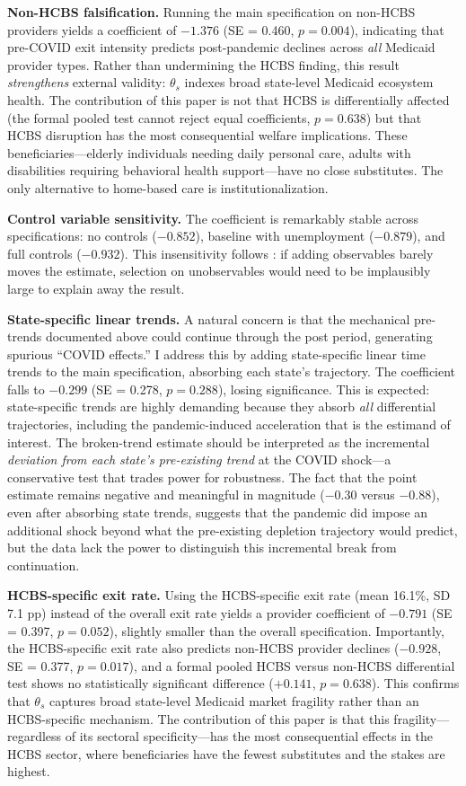 \documentclass[12pt]{article}
\begin{document}
\textbf{Non-HCBS falsification.} Running the main specification on non-HCBS providers yields a coefficient of $-1.376$ (SE = 0.460, $p = 0.004$), indicating that pre-COVID exit intensity predicts post-pandemic declines across \emph{all} Medicaid provider types. Rather than undermining the HCBS finding, this result \emph{strengthens} external validity: $\theta_s$ indexes broad state-level Medicaid ecosystem health. The contribution of this paper is not that HCBS is differentially affected (the formal pooled test cannot reject equal coefficients, $p = 0.638$) but that HCBS disruption has the most consequential welfare implications. These beneficiaries---elderly individuals needing daily personal care, adults with disabilities requiring behavioral health support---have no close substitutes. The only alternative to home-based care is institutionalization.

\textbf{Control variable sensitivity.} The coefficient is remarkably stable across specifications: no controls ($-0.852$), baseline with unemployment ($-0.879$), and full controls ($-0.932$). This insensitivity follows \citet{oster2019}: if adding observables barely moves the estimate, selection on unobservables would need to be implausibly large to explain away the result.

\textbf{State-specific linear trends.} A natural concern is that the mechanical pre-trends documented above could continue through the post period, generating spurious ``COVID effects.'' I address this by adding state-specific linear time trends to the main specification, absorbing each state's trajectory. The coefficient falls to $-0.299$ (SE = 0.278, $p = 0.288$), losing significance. This is expected: state-specific trends are highly demanding because they absorb \emph{all} differential trajectories, including the pandemic-induced acceleration that is the estimand of interest. The broken-trend estimate should be interpreted as the incremental \emph{deviation from each state's pre-existing trend} at the COVID shock---a conservative test that trades power for robustness. The fact that the point estimate remains negative and meaningful in magnitude ($-0.30$ versus $-0.88$), even after absorbing state trends, suggests that the pandemic did impose an additional shock beyond what the pre-existing depletion trajectory would predict, but the data lack the power to distinguish this incremental break from continuation.

\textbf{HCBS-specific exit rate.} Using the HCBS-specific exit rate (mean 16.1\%, SD 7.1 pp) instead of the overall exit rate yields a provider coefficient of $-0.791$ (SE = 0.397, $p = 0.052$), slightly smaller than the overall specification. Importantly, the HCBS-specific exit rate also predicts non-HCBS provider declines ($-0.928$, SE = 0.377, $p = 0.017$), and a formal pooled HCBS versus non-HCBS differential test shows no statistically significant difference ($+0.141$, $p = 0.638$). This confirms that $\theta_s$ captures broad state-level Medicaid market fragility rather than an HCBS-specific mechanism. The contribution of this paper is that this fragility---regardless of its sectoral specificity---has the most consequential effects in the HCBS sector, where beneficiaries have the fewest substitutes and the stakes are highest.
\end{document}
